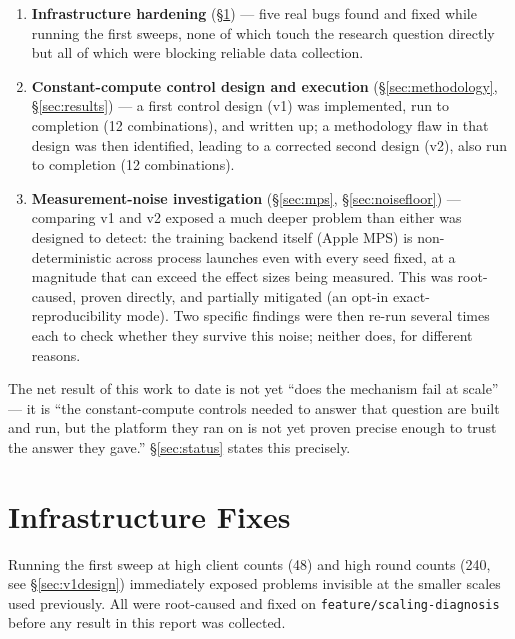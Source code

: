 \documentclass[11pt]{article}
\newcommand{\code}[1]{\texttt{#1}}
\begin{document}
\begin{enumerate}[leftmargin=1.4em]
    \item \textbf{Infrastructure hardening} (\S\ref{sec:infra}) --- five real bugs found and fixed
    while running the first sweeps, none of which touch the research question directly but all of
    which were blocking reliable data collection.
    \item \textbf{Constant-compute control design and execution} (\S\ref{sec:methodology},
    \S\ref{sec:results}) --- a first control design (v1) was implemented, run to completion (12
    combinations), and written up; a methodology flaw in that design was then identified, leading to
    a corrected second design (v2), also run to completion (12 combinations).
    \item \textbf{Measurement-noise investigation} (\S\ref{sec:mps}, \S\ref{sec:noisefloor}) ---
    comparing v1 and v2 exposed a much deeper problem than either was designed to detect: the
    training backend itself (Apple MPS) is non-deterministic across process launches even with
    every seed fixed, at a magnitude that can exceed the effect sizes being measured. This was
    root-caused, proven directly, and partially mitigated (an opt-in exact-reproducibility mode).
    Two specific findings were then re-run several times each to check whether they survive this
    noise; neither does, for different reasons.
\end{enumerate}

The net result of this work to date is not yet ``does the mechanism fail at scale'' --- it is
``the constant-compute controls needed to answer that question are built and run, but the platform
they ran on is not yet proven precise enough to trust the answer they gave.'' \S\ref{sec:status}
states this precisely.

\section{Infrastructure Fixes}
\label{sec:infra}

Running the first sweep at high client counts (48) and high round counts (240, see
\S\ref{sec:v1design}) immediately exposed problems invisible at the smaller scales used previously.
All were root-caused and fixed on \code{feature/scaling-diagnosis} before any result in this report
was collected.
\end{document}
